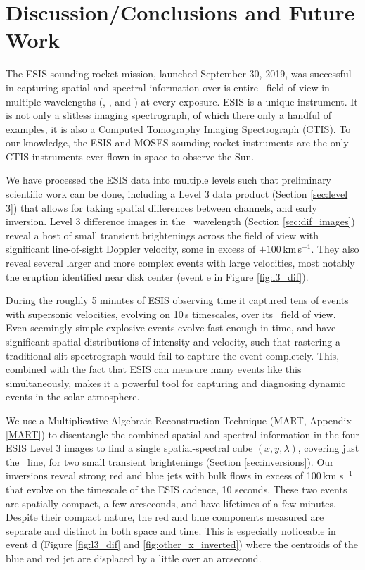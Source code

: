     	
\section{Discussion/Conclusions and Future Work}
	The ESIS sounding rocket mission, launched September 30, 2019, was successful in capturing spatial and spectral information over is entire \esisfov \ field of view in multiple wavelengths (\hei, \mgxbright, and \ov) at every exposure.
	ESIS is a unique instrument.  
	It is not only a slitless imaging spectrograph, of which there only a handful of examples, it is also a Computed Tomography Imaging Spectrograph (CTIS).  
	To our knowledge, the ESIS and MOSES sounding rocket instruments are the only CTIS instruments ever flown in space to observe the Sun. 
	
	We have processed the  ESIS data into multiple levels such that preliminary scientific work can be done, including a Level 3 data product (Section \ref{sec:level 3}) that allows for taking spatial differences between channels, and early inversion.
	Level 3 difference images in the \ov \ wavelength (Section \ref{sec:dif_images}) reveal a host of small transient brightenings across the field of view with significant line-of-sight Doppler velocity, some in excess of $\pm 100\,$km\,s$^{-1}$.
	They also reveal several larger and more complex events with large velocities, most notably the eruption identified near disk center (event e in Figure \ref{fig:l3_dif}).
	
    During the roughly 5 minutes of ESIS observing time it captured tens of events with supersonic velocities, evolving on 10\,s timescales, over its \esisfov \ field of view.
	Even seemingly simple explosive events evolve fast enough in time, and have significant spatial distributions of intensity and velocity, such that rastering a traditional slit spectrograph would fail to capture the event completely. 
	This, combined with the fact that ESIS can measure many events like this simultaneously, makes it a powerful tool for capturing and diagnosing dynamic events in the solar atmosphere.
	
	We use a Multiplicative Algebraic Reconstruction Technique (MART, Appendix \ref{MART}) to disentangle the combined spatial and spectral information in the four ESIS Level 3 images to find a single spatial-spectral cube $(x,y,\lambda)$, covering just the \ov\ line, for two small transient brightenings (Section \ref{sec:inversions}).
	Our inversions reveal strong red and blue jets with bulk flows in excess of 100\,km s$^{-1}$ that evolve on the timescale of the ESIS cadence, 10 seconds.
	These two events are spatially compact, a few arcseconds, and have lifetimes of a few minutes.
	Despite their compact nature, the red and blue components measured are separate and distinct in both space and time. 
	This is especially noticeable in event d (Figure \ref{fig:l3_dif} and \ref{fig:other_x_inverted}) where the centroids of the blue and red jet are displaced by a little over an arcsecond. 
	
